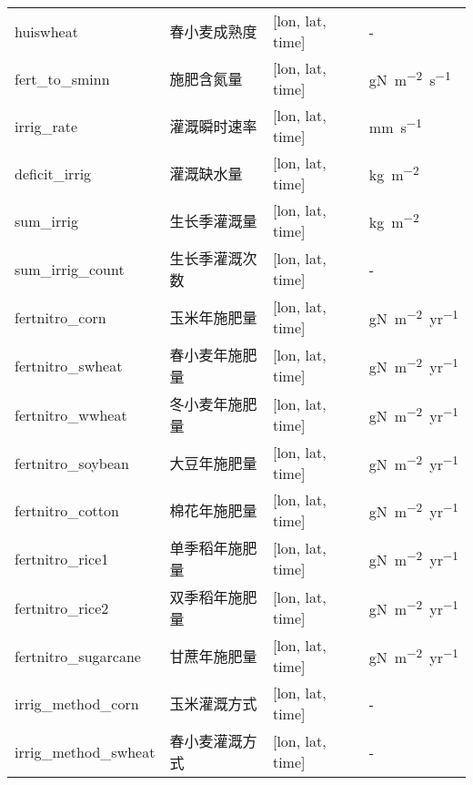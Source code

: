 {\begin{longtable}[htbp]{lp{}ll}
huiswheat & 春小麦成熟度 & {[}lon, lat, time{]} & - \\
fert\_to\_sminn & 施肥含氮量 & {[}lon, lat, time{]} & \unit{gN.m^{-2}.s^{-1}} \\
irrig\_rate & 灌溉瞬时速率 & {[}lon, lat, time{]} & \unit{mm.s^{-1}} \\
deficit\_irrig & 灌溉缺水量 & {[}lon, lat, time{]} & \unit{kg.m^{-2}} \\
sum\_irrig & 生长季灌溉量 & {[}lon, lat, time{]} & \unit{kg.m^{-2}} \\
sum\_irrig\_count & 生长季灌溉次数 & {[}lon, lat, time{]} & - \\
fertnitro\_corn & 玉米年施肥量 & {[}lon, lat, time{]} & \unit{gN.m^{-2}.yr^{-1}} \\
fertnitro\_swheat & 春小麦年施肥量 & {[}lon, lat, time{]} & \unit{gN.m^{-2}.yr^{-1}} \\
fertnitro\_wwheat & 冬小麦年施肥量 & {[}lon, lat, time{]} & \unit{gN.m^{-2}.yr^{-1}} \\
fertnitro\_soybean & 大豆年施肥量 & {[}lon, lat, time{]} & \unit{gN.m^{-2}.yr^{-1}} \\
fertnitro\_cotton & 棉花年施肥量 & {[}lon, lat, time{]} & \unit{gN.m^{-2}.yr^{-1}} \\
fertnitro\_rice1 & 单季稻年施肥量 & {[}lon, lat, time{]} & \unit{gN.m^{-2}.yr^{-1}} \\
fertnitro\_rice2 & 双季稻年施肥量 & {[}lon, lat, time{]} & \unit{gN.m^{-2}.yr^{-1}} \\
fertnitro\_sugarcane & 甘蔗年施肥量 & {[}lon, lat, time{]} & \unit{gN.m^{-2}.yr^{-1}} \\
irrig\_method\_corn & 玉米灌溉方式 & {[}lon, lat, time{]} & - \\
irrig\_method\_swheat & 春小麦灌溉方式 & {[}lon, lat, time{]} & - \\

\end{longtable}}

